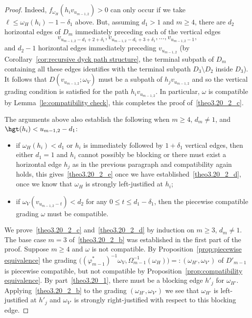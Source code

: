 \begin{proof}
 Indeed, $f_{\omega_H}(h_iv_{u_{m-1,2}})>0$ can only occur if we take $\ell\le\omega_H(h_i)-1-\delta_1$ above.
 But, assuming $d_1>1$ and $m\ge4$, there are $d_2$ horizontal edges of $D_m$ immediately preceding each of the vertical edges 
 \[v_{u_{m-1,2}-d_1+2+\delta_1},v_{u_{m-1,2}-d_1+3+\delta_1},\ldots,v_{u_{m-1,2}-1},\]
 and $d_2-1$ horizontal edges immediately preceding $v_{u_{m-1,2}}$ (by Corollary~\ref{cor:recursive dyck path structure}, the terminal subpath of $D_m$ containing all these edges identifies with the terminal subpath $D_3\setminus D_2$ inside $D_3$). 
 It follows that $D(v_{u_{m-1,2}};\omega_V)$ must be a subpath of $h_jv_{u_{m-1,2}}$ and so the vertical grading condition is satisfied for the path $h_iv_{u_{m-1,2}}$. 
 In particular, $\omega$ is compatible by Lemma~\ref{le:compatibility check}, this completes the proof of~\ref{theo3.20_2_c}.

 The arguments above also establish the following when $m\ge4$, $d_m\ne1$, and $\hgt(h_i)<u_{m-1,2}-d_1$:
 \begin{itemize}
 \item if $\omega_H(h_i)<d_1$ or $h_i$ is immediately followed by $1+\delta_1$ vertical edges, then either $d_1=1$ and $h_i$ cannot possibly be blocking or there must exist a horizontal edge $h_j$ as in the previous paragraph and compatibility again holds, this gives~\ref{theo3.20_2_e} once we have established~\ref{theo3.20_2_d}, \ie once we know that $\omega_H$ is strongly left-justified at $h_i$; 
 \item if $\omega_V(v_{u_{m-1,2}-t})<d_2$ for any $0\le t\le d_1-\delta_1$, then the piecewise compatible grading $\omega$ must be compatible.
 \end{itemize}

 We prove~\ref{theo3.20_2_c} and~\ref{theo3.20_2_d} by induction on $m\ge3$, $d_m\ne1$.
 The base case $m=3$ of~\ref{theo3.20_2_b} was established in the first part of the proof.
 Suppose $m\ge4$ and $\omega$ is not compatible. 
 By Proposition~\ref{prop:piecewise equivalence} the grading $\big((\varphi^*_{m-1})^{-1}\omega_V,\Omega_{m-1}^{-1}(\omega_H)\big)=:(\omega_{H'},\omega_{V'})$ of $D'_{m-1}$ is piecewise compatible, but not compatible by Proposition~\ref{prop:compatibility equivalence}. 
 By part~\ref{theo3.20_1}, there must be a blocking edge $h'_j$ for $\omega_{H'}$.
 Applying~\ref{theo3.20_2_b} to the grading $(\omega_{H'},\omega_{V'})$ we see that $\omega_{H'}$ is left-justified at $h'_j$ and $\omega_{V'}$ is strongly right-justified with respect to this blocking edge.


\end{proof}
